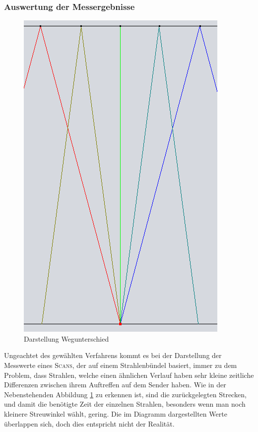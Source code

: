 \documentclass[reducespace,stylepage,semiarbeit]{spezidoc}
\begin{document}
\newpage
\subsubsection{Auswertung der Messergebnisse} %
\begin{figure}
\includegraphics[scale=0.25]{pictures/Strahlenbuendel.png} 
\caption{Darstellung Wegunterschied}
\label{fig:Wegunters}
\end{figure} 
Ungeachtet des gewählten Verfahrens kommt es bei der Darstellung der Messwerte eines \textsc{Scans}, der auf einem Strahlenbündel basiert, immer zu dem Problem, dass Strahlen, welche einen ähnlichen Verlauf haben sehr kleine zeitliche Differenzen zwischen ihrem Auftreffen auf dem Sender haben. 
Wie in der Nebenstehenden Abbildung \ref{fig:Wegunters} zu erkennen ist, sind die zurückgelegten Strecken, und damit die benötigte Zeit der einzelnen Strahlen, besonders wenn man noch kleinere Streuwinkel wählt, gering. 
Die im Diagramm dargestellten Werte überlappen sich, doch dies entspricht nicht der Realität. 
\end{document}
